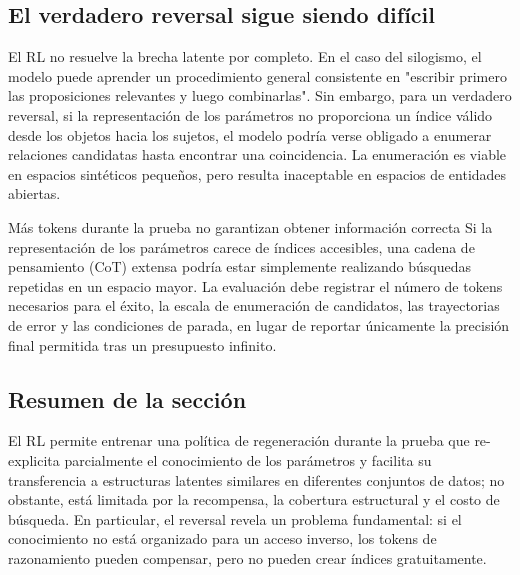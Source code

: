 \subsection{El verdadero reversal sigue siendo difícil}

El RL no resuelve la brecha latente por completo. En el caso del silogismo, el modelo puede aprender un procedimiento general consistente en "escribir primero las proposiciones relevantes y luego combinarlas". Sin embargo, para un verdadero reversal, si la representación de los parámetros no proporciona un índice válido desde los objetos hacia los sujetos, el modelo podría verse obligado a enumerar relaciones candidatas hasta encontrar una coincidencia. La enumeración es viable en espacios sintéticos pequeños, pero resulta inaceptable en espacios de entidades abiertas.




\begin{warningbox}{Más tokens durante la prueba no garantizan obtener información correcta}
Si la representación de los parámetros carece de índices accesibles, una cadena de pensamiento (CoT) extensa podría estar simplemente realizando búsquedas repetidas en un espacio mayor. La evaluación debe registrar el número de tokens necesarios para el éxito, la escala de enumeración de candidatos, las trayectorias de error y las condiciones de parada, en lugar de reportar únicamente la precisión final permitida tras un presupuesto infinito.
\end{warningbox}

\subsection{Resumen de la sección}

El RL permite entrenar una política de regeneración durante la prueba que re-explicita parcialmente el conocimiento de los parámetros y facilita su transferencia a estructuras latentes similares en diferentes conjuntos de datos; no obstante, está limitada por la recompensa, la cobertura estructural y el costo de búsqueda. En particular, el reversal revela un problema fundamental: si el conocimiento no está organizado para un acceso inverso, los tokens de razonamiento pueden compensar, pero no pueden crear índices gratuitamente.
